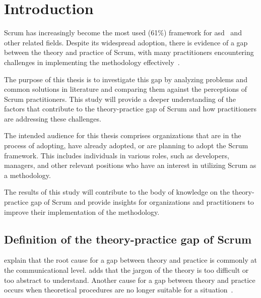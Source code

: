 \chapter{Introduction}\label{cha:Introduction}
Scrum has increasingly become the most used (61\%) \gls{framework} for \acf{asd}~\cite{Flynn20221AS} and other related fields. Despite its widespread \gls{adoption}, there is evidence of a gap between the theory and practice of Scrum, with many practitioners encountering challenges in implementing the \gls{methodology} effectively~\cite[p.~185]{Jilani2020ItG}.

The purpose of this thesis is to investigate this gap by analyzing problems and common solutions in literature and comparing them against the perceptions of Scrum practitioners. This study will provide a deeper understanding of the factors that contribute to the theory-practice gap of Scrum and how practitioners are addressing these challenges. 

The intended audience for this thesis comprises organizations that are in the process of adopting, have already adopted, or are planning to adopt the Scrum \gls{framework}. This includes individuals in various roles, such as developers, managers, and other relevant positions who have an interest in utilizing Scrum as a \gls{methodology}.

The results of this study will contribute to the body of knowledge on the theory-practice gap of Scrum and provide insights for organizations and practitioners to improve their implementation of the \gls{methodology}.

\section{Definition of the theory-practice gap of Scrum}\label{sec:DefinitionTheoryPracticeGap}
 explain that the root cause for a gap between theory and practice is commonly at the communicational level.  adds that the jargon of the theory is too difficult or too abstract to understand. Another cause for a gap between theory and practice occurs when theoretical procedures are no longer suitable for a situation~\cite[pp.~61--76]{Carr1980TGb}.


